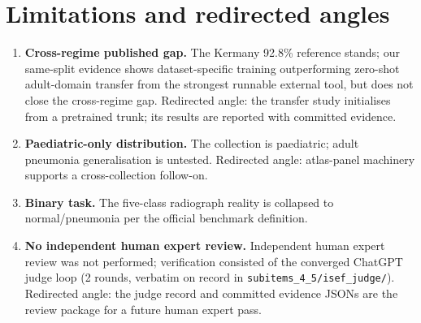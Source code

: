 \section{Limitations and redirected angles}
\begin{enumerate}
\item \textbf{Cross-regime published gap.} The Kermany 92.8\% reference
stands; our same-split evidence shows dataset-specific training outperforming zero-shot adult-domain transfer from the strongest runnable external tool, but does not close the cross-regime gap. Redirected angle: the
transfer study initialises from a pretrained trunk; its results are
reported with committed evidence.
\item \textbf{Paediatric-only distribution.} The collection is paediatric;
adult pneumonia generalisation is untested. Redirected angle: atlas-panel
machinery supports a cross-collection follow-on.
\item \textbf{Binary task.} The five-class radiograph reality is collapsed
to normal/pneumonia per the official benchmark definition.
\item \textbf{No independent human expert review.} Independent
human expert review was not performed; verification consisted of the
converged ChatGPT judge loop (2 rounds, verbatim on record in
\texttt{subitems\_4\_5/isef\_judge/}). Redirected angle: the judge
record and committed evidence JSONs are the review package for a
future human expert pass.
\end{enumerate}
